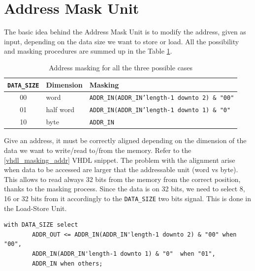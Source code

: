 \section{Address Mask Unit}
The basic idea behind the Address Mask Unit is to modify the address, given as input, depending on the data size we want to store or load. All the possibility and masking procedures are summed up in the Table \ref{tab:addr_masking}. 

\begin{table}[ht]
	\begin{center}
		\begin{tabular}{ c| l | l}
			\texttt{DATA\_SIZE} & \textbf{Dimension} & \textbf{Masking}\\
			\hline
			00 & word & \texttt{ADDR\_IN(ADDR\_IN'length-1 downto 2) \& "00"}\\
			01 & half word & \texttt{ADDR\_IN(ADDR\_IN'length-1 downto 1) \& "0"} \\
			10 & byte & \texttt{ADDR\_IN}
			
		\end{tabular}
		\caption{Address masking for all the three possible cases}
		\label{tab:addr_masking}
	\end{center}
\end{table}


Give an address, it must be correctly aligned depending on the dimension of the data we want to write/read to/from the memory. Refer to the \ref{vhdl_masking_addr} VHDL snippet. The problem with the alignment arise when data to be accessed are larger that the addressable unit (word vs byte). This allows to read always 32 bits from the memory from the correct position, thanks to the masking process. Since the data is on 32 bits, we need to select 8, 16 or 32 bits from it accordingly to the \texttt{DATA\_SIZE} two bits signal. This is done in the Load-Store Unit.

\hfill
\begin{lstlisting}[style=vhdl,caption={VHDL code for address alignment},label=vhdl_masking_addr]
	with DATA_SIZE select
		ADDR_OUT <= ADDR_IN(ADDR_IN'length-1 downto 2) & "00" when "00",
		ADDR_IN(ADDR_IN'length-1 downto 1) & "0"  when "01",
		ADDR_IN when others;
\end{lstlisting}

